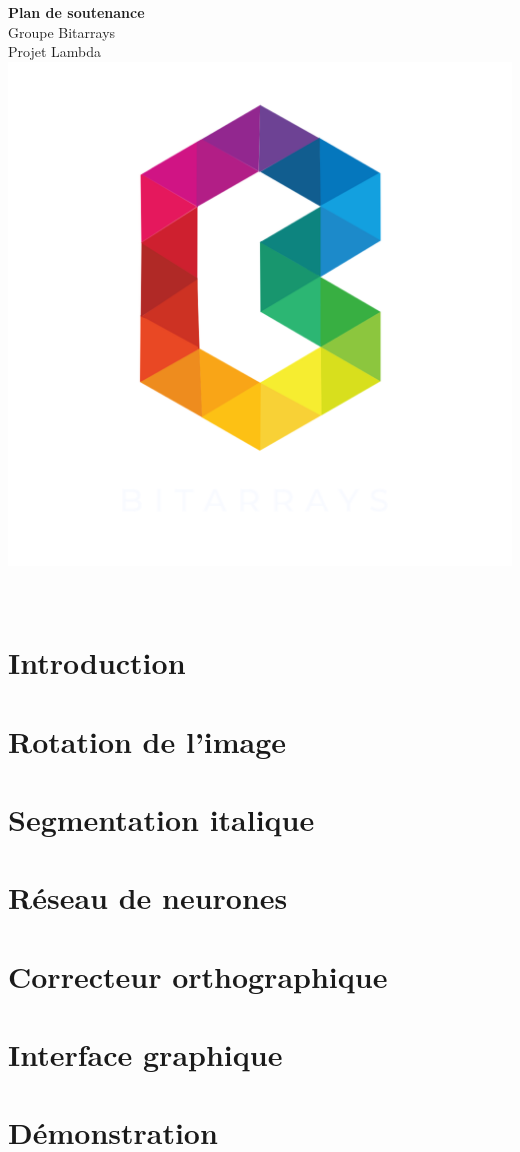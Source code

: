 \documentclass{article}
\begin{document}
\begin{center}
	\begin{huge}
		\textbf{Plan de soutenance}
		\\
		\vspace*{0.5cm}
		Groupe Bitarrays\\ Projet Lambda
		\\
		\vspace*{1cm}
		\includegraphics[scale=0.2]{LogoBitarrays}
	\end{huge}
\end{center}\
\vspace*{1cm}
	\tableofcontents
	\newpage
	\section{Introduction}
	\section{Rotation de l'image}
	\section{Segmentation italique}
	\section{Réseau de neurones}
	\section{Correcteur orthographique}
	\section{Interface graphique}
	\section{Démonstration}
\end{document}
